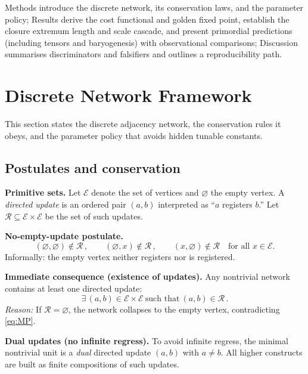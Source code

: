 \documentclass[11pt]{article}
\theoremstyle{definition}
\theoremstyle{remark}
\begin{document}
Methods introduce the discrete network, its conservation laws, and the parameter policy; Results derive the cost functional and golden fixed point, establish the closure extremum length and scale cascade, and present primordial predictions (including tensors and baryogenesis) with observational comparisons; Discussion summarises discriminators and falsifiers and outlines a reproducibility path.

\section{Discrete Network Framework}

This section states the discrete adjacency network, the conservation rules it obeys, and the parameter policy that avoids hidden tunable constants.

\subsection{Postulates and conservation}

\textbf{Primitive sets.}
Let \(\mathcal{E}\) denote the set of vertices and \(\varnothing\) the empty vertex. A \emph{directed update} is an ordered pair \((a,b)\) interpreted as “\(a\) registers \(b\).” Let \(\mathcal{R}\subseteq \mathcal{E}\times\mathcal{E}\) be the set of such updates.

\medskip
\textbf{No-empty-update postulate.}
\begin{equation}
\label{eq:MP}
(\varnothing,\varnothing)\notin \mathcal{R}\,,
\qquad
(\varnothing,x)\notin \mathcal{R}\,,
\qquad
(x,\varnothing)\notin \mathcal{R}
\quad
\text{for all } x\in\mathcal{E}.
\end{equation}
Informally: the empty vertex neither registers nor is registered.

\medskip
\textbf{Immediate consequence (existence of updates).}
Any nontrivial network contains at least one directed update:
\begin{equation}
\label{eq:nonemptyR}
\exists\,(a,b)\in \mathcal{E}\times\mathcal{E}\ \text{such that}\ (a,b)\in \mathcal{R}\,.
\end{equation}
\emph{Reason:} If \(\mathcal{R}=\varnothing\), the network collapses to the empty vertex, contradicting \eqref{eq:MP}.

\medskip
\textbf{Dual updates (no infinite regress).}
To avoid infinite regress, the minimal nontrivial unit is a \emph{dual} directed update \((a,b)\) with \(a\neq b\). All higher constructs are built as finite compositions of such updates.
\end{document}
